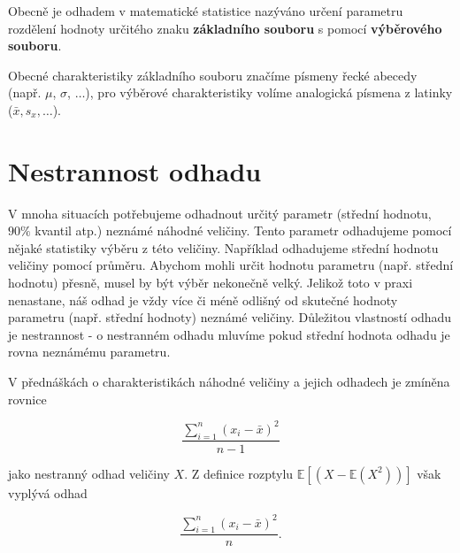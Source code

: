 \documentclass[
  letterpaper,
  DIV=11,
  numbers=noendperiod]{scrreprt}
\begin{document}
Obecně je odhadem v matematické statistice nazýváno určení parametru
rozdělení hodnoty určitého znaku \textbf{základního souboru} s pomocí
\textbf{výběrového souboru}.

Obecné charakteristiky základního souboru značíme písmeny řecké abecedy
(např. \(\mu\), \(\sigma\), \(\ldots\)), pro výběrové charakteristiky
volíme analogická písmena z latinky (\(\bar{x}, s_x, \ldots\)).

\hypertarget{nestrannost-odhadu}{%
\section{Nestrannost odhadu}\label{nestrannost-odhadu}}

V mnoha situacích potřebujeme odhadnout určitý parametr (střední
hodnotu, \(90\%\) kvantil atp.) neznámé náhodné veličiny. Tento parametr
odhadujeme pomocí nějaké statistiky výběru z této veličiny. Například
odhadujeme střední hodnotu veličiny pomocí průměru. Abychom mohli určit
hodnotu parametru (např. střední hodnotu) přesně, musel by být výběr
nekonečně velký. Jelikož toto v praxi nenastane, náš odhad je vždy více
či méně odlišný od skutečné hodnoty parametru (např. střední hodnoty)
neznámé veličiny. Důležitou vlastností odhadu je nestrannost - o
nestranném odhadu mluvíme pokud střední hodnota odhadu je rovna
neznámému parametru.

V přednáškách o charakteristikách náhodné veličiny a jejich odhadech je
zmíněna rovnice

\[
\dfrac{\sum\limits_{i=1}^{n}(x_i - \bar{x})^2}{n-1}
\]

jako nestranný odhad veličiny \(X\). Z definice rozptylu
\(\mathbb{E}[(X - \mathbb{E}(X^2))]\) však vyplývá odhad

\[
\dfrac{\sum\limits_{i=1}^{n}(x_i - \bar{x})^2}{n}.
\]
\end{document}
